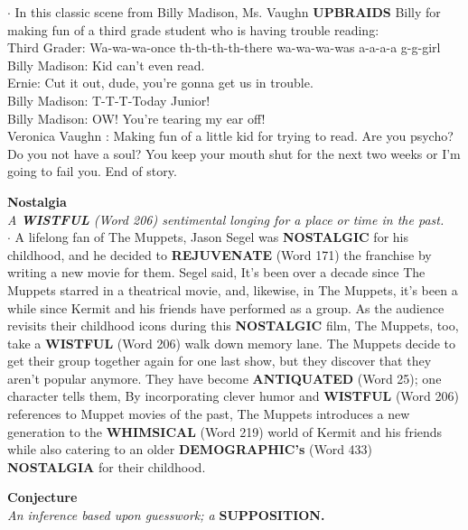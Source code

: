 \documentclass{exam}
\begin{document}
\begin{questions}
$\cdot$ In this classic scene from Billy Madison, Ms. Vaughn \textbf{UPBRAIDS} Billy for making fun of a third grade student who is having trouble reading: \\Third Grader: Wa-wa-wa-once th-th-th-th-there wa-wa-wa-was a-a-a-a g-g-girl \\Billy Madison: Kid can't even read. \\Ernie: Cut it out, dude, you're gonna get us in trouble. \\Billy Madison: T-T-T-Today Junior! \\Billy Madison: OW! You're tearing my ear off! \\Veronica Vaughn : Making fun of a little kid for trying to read. Are you psycho? Do you not have a soul? You keep your mouth shut for the next two weeks or I'm going to fail you. End of story.

\question  \textbf{Nostalgia}\\
\textit{A \textbf{WISTFUL} (Word 206) sentimental longing for a place or time in the past.}\\

$\cdot$ A lifelong fan of The Muppets, Jason Segel was \textbf{NOSTALGIC} for his childhood, and he decided to  \textbf{REJUVENATE} (Word 171) the franchise by writing a new movie for them. Segel said,  It's been over a decade since The Muppets starred in a theatrical movie, and, likewise, in The Muppets, it's been a while since Kermit and his friends have performed as a group. As the audience revisits their childhood icons during this \textbf{NOSTALGIC} film, The Muppets, too, take a \textbf{WISTFUL} (Word 206) walk down memory lane. The Muppets decide to get their group together again for one last show, but they discover that they aren't popular anymore. They have become \textbf{ANTIQUATED} (Word 25); one character tells them,  By incorporating clever humor and  \textbf{WISTFUL} (Word 206) references to Muppet movies of the past, The Muppets introduces a new generation to the \textbf{WHIMSICAL} (Word 219) world of Kermit and his friends while also catering to an older \textbf{DEMOGRAPHIC's} (Word 433)  \textbf{ NOSTALGIA} for their childhood.

\question \textbf{Conjecture}\\
\textit{ An inference based upon guesswork; a} \textbf{SUPPOSITION.}\\


\end{questions}
\end{document}

